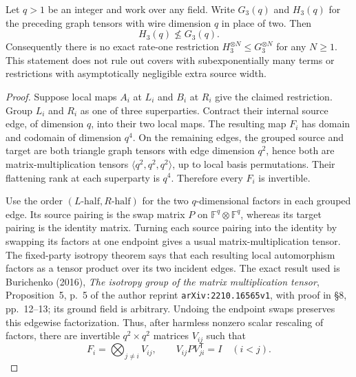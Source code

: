 \begin{proposition}
\label{prop:k33-no-direct}
Let $q>1$ be an integer and work over any field.  Write $G_3(q)$
and $H_3(q)$ for the preceding graph tensors with wire dimension
$q$ in place of two.  Then
\[
 H_3(q)\not\le G_3(q).
\]
Consequently there is no exact rate-one restriction
$H_3^{\otimes N}\le G_3^{\otimes N}$ for any $N\ge1$.
This statement does not rule out covers with subexponentially
many terms or restrictions with asymptotically negligible extra
source width.
\end{proposition}
\begin{proof}
Suppose local maps $A_i$ at $L_i$ and $B_i$ at $R_i$ give the
claimed restriction.  Group $L_i$ and $R_i$ as one of three
superparties.  Contract their internal source edge, of dimension
$q$, into their two local maps.  The resulting map $F_i$ has
domain and codomain of dimension $q^4$.  On the remaining edges,
the grouped source and target are both triangle graph tensors
with edge dimension $q^2$, hence both are matrix-multiplication
tensors $\langle q^2,q^2,q^2\rangle$, up to local basis
permutations.  Their flattening rank at each superparty is $q^4$.
Therefore every $F_i$ is invertible.

Use the order $(L\text{-half},R\text{-half})$ for the two
$q$-dimensional factors in each grouped edge.  Its source pairing
is the swap matrix $P$ on $\mathbb F^q\otimes\mathbb F^q$,
whereas its target pairing is the identity matrix.  Turning each
source pairing into the identity by swapping its factors at one
endpoint gives a usual matrix-multiplication tensor.  The
fixed-party isotropy theorem says that each resulting local
automorphism factors as a tensor product over its two incident
edges.  The exact result used is Burichenko (2016),
\emph{The isotropy group of the matrix multiplication tensor},
Proposition~5, p.~5 of the author reprint
\texttt{arXiv:2210.16565v1}, with proof in \S8, pp.~12--13;
its ground field is arbitrary.  Undoing the endpoint swaps
preserves this edgewise factorization.  Thus, after harmless
nonzero scalar rescaling of factors, there are invertible
$q^2\times q^2$ matrices $V_{ij}$ such that
\[
 F_i=\bigotimes_{j\ne i}V_{ij},\qquad
 V_{ij}P V_{ji}^{\mathsf T}=I\quad(i<j).
 \tag{\(*\)}
\]


\end{proof}
